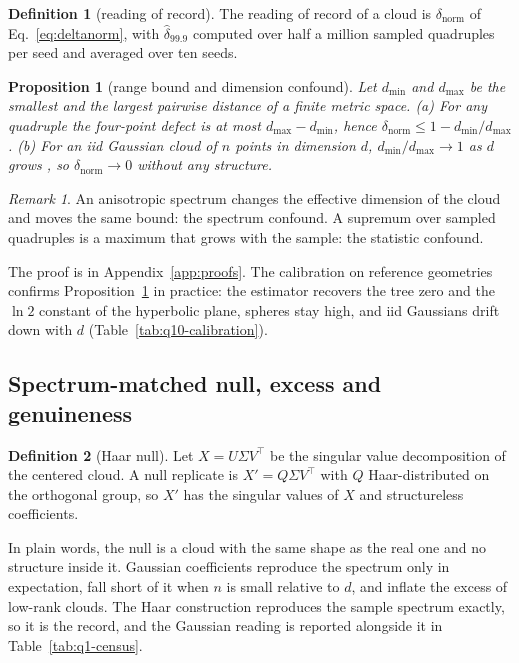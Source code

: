 \documentclass{article}
\theoremstyle{definition}
\newtheorem{definition}{Definition}
\theoremstyle{plain}
\newtheorem{proposition}{Proposition}
\theoremstyle{remark}
\newtheorem*{remark}{Remark}
\begin{document}
\begin{definition}[reading of record]
\label{def:record}
The reading of record of a cloud is $\delta_{\text{norm}}$ of Eq.~\ref{eq:deltanorm}, with $\hat\delta_{99.9}$ computed over half a million sampled quadruples per seed and averaged over ten seeds.
\end{definition}
\begin{proposition}[range bound and dimension confound]
\label{prop:bound}
Let $d_{\min}$ and $d_{\max}$ be the smallest and the largest pairwise distance of a finite metric space. (a) For any quadruple the four-point defect is at most $d_{\max}-d_{\min}$, hence $\delta_{\text{norm}}\le 1-d_{\min}/d_{\max}$. (b) For an iid Gaussian cloud of $n$ points in dimension $d$, $d_{\min}/d_{\max}\to1$ as $d$ grows \citep{beyer1999nearest, aggarwal2001surprising}, so $\delta_{\text{norm}}\to0$ without any structure.
\end{proposition}
\begin{remark}
An anisotropic spectrum changes the effective dimension of the cloud and moves the same bound: the spectrum confound. A supremum over sampled quadruples is a maximum that grows with the sample: the statistic confound.
\end{remark}
The proof is in Appendix~\ref{app:proofs}. The calibration on reference geometries confirms Proposition~\ref{prop:bound} in practice: the estimator recovers the tree zero and the $\ln 2$ constant of the hyperbolic plane, spheres stay high, and iid Gaussians drift down with $d$ (Table~\ref{tab:q10-calibration}).

\subsection{Spectrum-matched null, excess and genuineness}
\label{sec:v3-null}

\begin{definition}[Haar null]
\label{def:null}
Let $X=U\Sigma V^{\top}$ be the singular value decomposition of the centered cloud. A null replicate is $X'=Q\Sigma V^{\top}$ with $Q$ Haar-distributed on the orthogonal group, so $X'$ has the singular values of $X$ and structureless coefficients.
\end{definition}
In plain words, the null is a cloud with the same shape as the real one and no structure inside it. Gaussian coefficients reproduce the spectrum only in expectation, fall short of it when $n$ is small relative to $d$, and inflate the excess of low-rank clouds. The Haar construction reproduces the sample spectrum exactly, so it is the record, and the Gaussian reading is reported alongside it in Table~\ref{tab:q1-census}.
\end{document}
